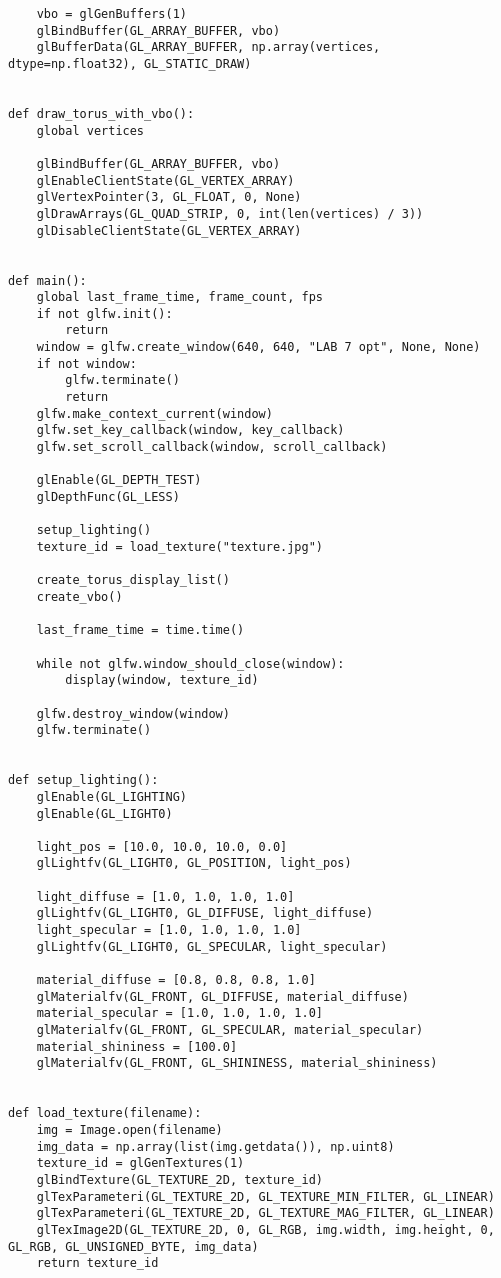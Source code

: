 \documentclass[a4paper, 14pt]{extarticle}
\begin{document}
\begin{lstlisting}
    vbo = glGenBuffers(1)
    glBindBuffer(GL_ARRAY_BUFFER, vbo)
    glBufferData(GL_ARRAY_BUFFER, np.array(vertices, dtype=np.float32), GL_STATIC_DRAW)


def draw_torus_with_vbo():
    global vertices

    glBindBuffer(GL_ARRAY_BUFFER, vbo)
    glEnableClientState(GL_VERTEX_ARRAY)
    glVertexPointer(3, GL_FLOAT, 0, None)
    glDrawArrays(GL_QUAD_STRIP, 0, int(len(vertices) / 3))
    glDisableClientState(GL_VERTEX_ARRAY)


def main():
    global last_frame_time, frame_count, fps
    if not glfw.init():
        return
    window = glfw.create_window(640, 640, "LAB 7 opt", None, None)
    if not window:
        glfw.terminate()
        return
    glfw.make_context_current(window)
    glfw.set_key_callback(window, key_callback)
    glfw.set_scroll_callback(window, scroll_callback)

    glEnable(GL_DEPTH_TEST)
    glDepthFunc(GL_LESS)

    setup_lighting()
    texture_id = load_texture("texture.jpg")

    create_torus_display_list()
    create_vbo()

    last_frame_time = time.time()

    while not glfw.window_should_close(window):
        display(window, texture_id)

    glfw.destroy_window(window)
    glfw.terminate()


def setup_lighting():
    glEnable(GL_LIGHTING)
    glEnable(GL_LIGHT0)

    light_pos = [10.0, 10.0, 10.0, 0.0]
    glLightfv(GL_LIGHT0, GL_POSITION, light_pos)

    light_diffuse = [1.0, 1.0, 1.0, 1.0]
    glLightfv(GL_LIGHT0, GL_DIFFUSE, light_diffuse)
    light_specular = [1.0, 1.0, 1.0, 1.0]
    glLightfv(GL_LIGHT0, GL_SPECULAR, light_specular)

    material_diffuse = [0.8, 0.8, 0.8, 1.0]
    glMaterialfv(GL_FRONT, GL_DIFFUSE, material_diffuse)
    material_specular = [1.0, 1.0, 1.0, 1.0]
    glMaterialfv(GL_FRONT, GL_SPECULAR, material_specular)
    material_shininess = [100.0]
    glMaterialfv(GL_FRONT, GL_SHININESS, material_shininess)


def load_texture(filename):
    img = Image.open(filename)
    img_data = np.array(list(img.getdata()), np.uint8)
    texture_id = glGenTextures(1)
    glBindTexture(GL_TEXTURE_2D, texture_id)
    glTexParameteri(GL_TEXTURE_2D, GL_TEXTURE_MIN_FILTER, GL_LINEAR)
    glTexParameteri(GL_TEXTURE_2D, GL_TEXTURE_MAG_FILTER, GL_LINEAR)
    glTexImage2D(GL_TEXTURE_2D, 0, GL_RGB, img.width, img.height, 0, GL_RGB, GL_UNSIGNED_BYTE, img_data)
    return texture_id



\end{lstlisting}
\end{document}
